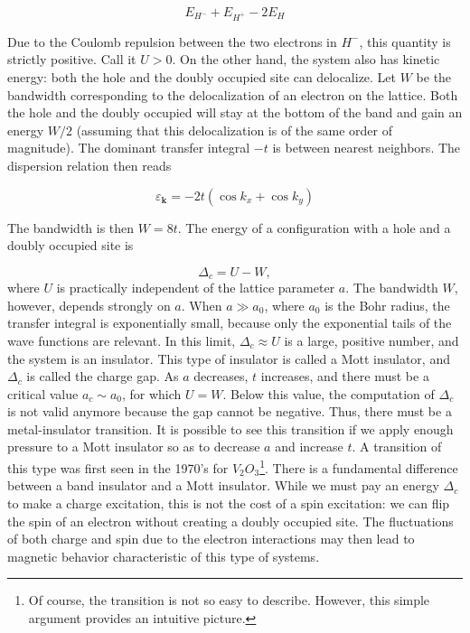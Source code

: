 \begin{equation}
E_{H^-} + E_{H^+} - 2 E_H 
\end{equation}

Due to the Coulomb repulsion between the two electrons in $H^-$, this quantity is strictly positive.
Call it $U > 0$.
On the other hand, the system also has kinetic energy: both the hole and the doubly occupied site can delocalize.
Let $W$ be the bandwidth corresponding to the delocalization of an electron on the lattice.
Both the hole and the doubly occupied will stay at the bottom of the band and gain an energy $W/2$ (assuming that this delocalization is of the same order of magnitude).
The dominant transfer integral $-t$ is between nearest neighbors.
The dispersion relation then reads

\begin{equation}
\varepsilon_{\bm k} = -2 t ( \cos k_x + \cos k_y ) 
\end{equation}

The bandwidth is then $W = 8 t$.
The energy of a configuration with a hole and a doubly occupied site is

\begin{equation}
\Delta_c = U - W ,
\end{equation}
where $U$ is practically independent of the lattice parameter $a$.
The bandwidth $W$, however, depends strongly on $a$.
When $a \gg a_0$, where $a_0$ is the Bohr radius, the transfer integral is exponentially small, because only the exponential tails of the wave functions are relevant.
In this limit, $\Delta_c \approx U$ is a large, positive number, and the system is an insulator.
This type of insulator is called a Mott insulator, and $\Delta_c$ is called the charge gap.
As $a$ decreases, $t$ increases, and there must be a critical value $a_c \sim a_0$, for which $U = W$.
Below this value, the computation of $\Delta_c$ is not valid anymore because the gap cannot be negative.
Thus, there must be a metal-insulator transition.
It is possible to see this transition if we apply enough pressure to a Mott insulator so as to decrease $a$ and increase $t$.
A transition of this type was first seen in the 1970's for $V_2 O_3$\footnote{Of course, the transition is not so easy to describe.
However, this simple argument provides an intuitive picture.}.
There is a fundamental difference between a band insulator and a Mott insulator.
While we must pay an energy $\Delta_c$ to make a charge excitation, this is not the cost of a spin excitation: we can flip the spin of an electron without creating a doubly occupied site.
The fluctuations of both charge and spin due to the electron interactions may then lead to magnetic behavior characteristic of this type of systems.